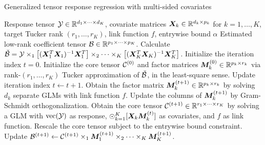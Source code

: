 \documentclass{article}
\begin{document}
\begin{algorithm}[t]
\caption{Generalized tensor response regression with multi-sided covariates}\label{alg:B}
\begin{algorithmic}[1]
\INPUT Response tensor $\mathcal{Y}\in \mathbb{R}^{d_1\times \cdots \times d_K}$, covariate matrices $\bm X_k\in\mathbb{R}^{d_k\times p_k}$ for $k=1,\ldots,K$, target Tucker rank $(r_1,\ldots,r_K)$, link function $f$, entrywise bound $\alpha$
\OUTPUT Estimated low-rank coefficient tensor $\mathcal{B}\in\mathbb{R}^{p_1\times \cdots\times p_K}$. 
\State Calculate $\check {\mathcal{B}}=\mathcal{Y}\times_1 \left[(\bm X_1^T\bm X_1)^{-1}\bm X^T_1\right] \times_2\cdots\times_K\left[(\bm X_K^T\bm X_K)^{-1}\bm X^T_K\right] $.
\State Initialize the iteration index $t=0$.
\State Initialize the core tensor $\mathcal{C}^{(0)}$ and factor matrices $\bm M^{(0)}_k\in\mathbb{R}^{p_k\times r_k}$ via rank-$(r_1,\ldots,r_K)$ Tucker approximation of $\check{\mathcal{B}}$, in the least-square sense. 
\State Update iteration index $t \leftarrow t+1$.
\State Obtain the factor matrix $\bm M_k^{(t+1)}\in\mathbb{R}^{p_k\times r_k}$ by solving $d_k$ separate GLMs with link function $f$. 
\State Update the columns of $\bm M_k^{(t+1)}$ by Gram-Schmidt orthogonalization.
\EndFor
\State Obtain the core tensor $\mathcal{C}^{(t+1)}\in\mathbb{R}^{r_1\times\cdots\times r_K}$ by solving a GLM with $\text{vec}(\mathcal{Y})$ as response, $\odot_{k=1}^K[ \bm X_k\bm M^{(t)}_k]$ as covariates, and $f$ as link function. 
\State Rescale the core tensor subject to the entrywise bound constraint. 
\State Update $\mathcal{B}^{(t+1)}\leftarrow \mathcal{C}^{(t+1)}\times_1\bm M_1^{(t+1)}\times_2\cdots\times_K\bm M_K^{(t+1)}$.
\EndWhile
\end{algorithmic}
\end{algorithm}
\end{document}
